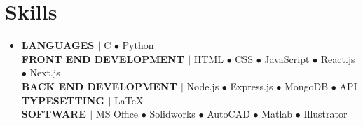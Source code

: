 \section{Skills}

\begin{itemize}[leftmargin=0.15in, label={}]
	\item{
		\textbf{LANGUAGES $|$ }{C $\bullet$ Python} \\
		\textbf{FRONT END DEVELOPMENT $|$ }{HTML $\bullet$ CSS $\bullet$ JavaScript $\bullet$ React.js $\bullet$ Next.js} \\
		\textbf{BACK END DEVELOPMENT $|$ }{Node.js $\bullet$ Express.js $\bullet$ MongoDB $\bullet$ API} \\
		\textbf{TYPESETTING $|$ }{\LaTeX}\\
		\textbf{SOFTWARE $|$ }{MS Office $\bullet$ Solidworks $\bullet$ AutoCAD $\bullet$ Matlab $\bullet$ Illustrator}
	}
\end{itemize}